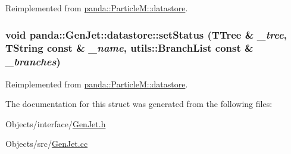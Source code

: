 Reimplemented from \hyperlink{structpanda_1_1ParticleM_1_1datastore_ab9f9e7afb145c12941baa10892ed1811}{panda::ParticleM::datastore}.\hypertarget{structpanda_1_1GenJet_1_1datastore_a7b9f67fdc168e7a372a9430c2b9866e3}{
\subsubsection[{setStatus}]{\setlength{\rightskip}{0pt plus 5cm}void panda::GenJet::datastore::setStatus (TTree \& {\em \_\-tree}, \/  TString const \& {\em \_\-name}, \/  {\bf utils::BranchList} const \& {\em \_\-branches})}}
\label{structpanda_1_1GenJet_1_1datastore_a7b9f67fdc168e7a372a9430c2b9866e3}


Reimplemented from \hyperlink{structpanda_1_1ParticleM_1_1datastore_a0329bec2c84d16ff16e15824890e7a86}{panda::ParticleM::datastore}.

The documentation for this struct was generated from the following files:\begin{DoxyCompactItemize}
\item 
Objects/interface/\hyperlink{GenJet_8h}{GenJet.h}\item 
Objects/src/\hyperlink{GenJet_8cc}{GenJet.cc}\end{DoxyCompactItemize}
